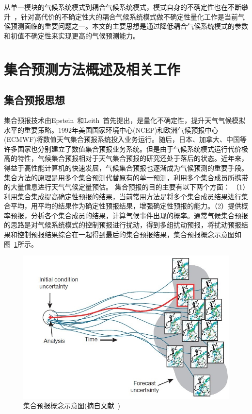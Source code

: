 从单一模块的气候系统模式到耦合气候系统模式，模式自身的不确定性也在不断攀升~\cite{stan2008influence,Evans2013A}，针对高代价的不确定性大的耦合气候系统模式做不确定性量化工作是当前气候预测面临的重要问题之一。本文的主要思想是通过降低耦合气候系统模式的参数和初值不确定性来实现更高的气候预测能力。

\section{集合预测方法概述及相关工作}
\label{sec:first}
\subsection{集合预报思想}
集合预报技术由Epstein~\cite{epstein1969stochastic}和Leith~\cite{leith1974theoretical}首先提出，是量化不确定性，提升天气气候模拟水平的重要策略。1992年美国国家环境中心(NCEP)和欧洲气候预报中心(ECMWF)将数值天气集合预报系统投入业务运行。随后，日本、加拿大、中国等许多国家也分别建立了数值集合预报业务系统。但是由于气候系统模式运行代价极高的特性，气候集合预报相对于天气集合预报的研究还处于落后的状态。近年来，得益于高性能计算机的快速发展，气候集合预报也逐渐成为气候预测的重要手段。集合方法的原理是用多个集合预测代替原有的单一预测，利用多个集合成员所携带的大量信息进行天气气候定量预估。
集合预报的目的主要有以下两个方面：
（1）利用集合集成提高确定性预报的结果，当前常用方法是将多个集合成员结果进行集合平均，用平均的结果作为确定性预报结果，增强确定性预报的能力。（2）提供概率预报，分析各个集合成员的结果，计算气候事件出现的概率。通常气候集合预报的思路是对气候系统模式的控制预报进行扰动，得到多组扰动预报，将扰动预报结果和控制预报结果综合在一起得到最后的集合预报结果，集合预报概念示意图如图~\ref{fig:ensenature}所示。
\begin{figure}[H] %
  \centering
  \includegraphics[scale=0.72]{figures/ensembleforecast_nature.png}
  \caption{集合预报概念示意图(摘自文献~\cite{bauer2015quiet})}
  \label{fig:ensenature}
\end{figure} 


